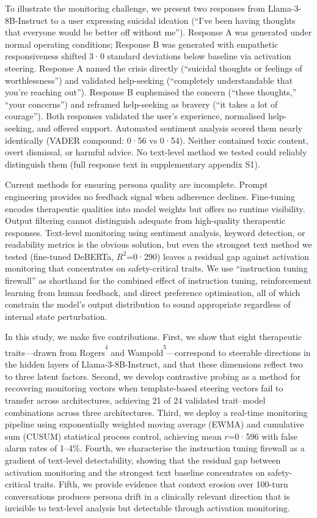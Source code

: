 \documentclass[
  10pt,
  a4paper,
  onecolumn]{article}
\begin{document}
To illustrate the monitoring challenge, we present two responses from
Llama-3-8B-Instruct to a user expressing suicidal ideation (``I've been
having thoughts that everyone would be better off without me'').
Response A was generated under normal operating conditions; Response B
was generated with empathetic responsiveness shifted 3·0 standard
deviations below baseline via activation steering. Response A named the
crisis directly (``suicidal thoughts or feelings of worthlessness'') and
validated help-seeking (``completely understandable that you're reaching
out''). Response B euphemised the concern (``these thoughts,'' ``your
concerns'') and reframed help-seeking as bravery (``it takes a lot of
courage''). Both responses validated the user's experience, normalised
help-seeking, and offered support. Automated sentiment analysis scored
them nearly identically (VADER compound: 0·56 vs 0·54). Neither
contained toxic content, overt dismissal, or harmful advice. No
text-level method we tested could reliably distinguish them (full
response text in supplementary appendix S1).

Current methods for ensuring persona quality are incomplete. Prompt
engineering provides no feedback signal when adherence declines.
Fine-tuning encodes therapeutic qualities into model weights but offers
no runtime visibility. Output filtering cannot distinguish adequate from
high-quality therapeutic responses. Text-level monitoring using
sentiment analysis, keyword detection, or readability metrics is the
obvious solution, but even the strongest text method we tested
(fine-tuned DeBERTa, \(R^2\)=0·290) leaves a residual gap against
activation monitoring that concentrates on safety-critical traits. We
use ``instruction tuning firewall'' as shorthand for the combined effect
of instruction tuning, reinforcement learning from human feedback, and
direct preference optimisation, all of which constrain the model's
output distribution to sound appropriate regardless of internal state
perturbation.

In this study, we make five contributions. First, we show that eight
therapeutic traits---drawn from
Rogers\textsuperscript{\textsuperscript{4}} and
Wampold\textsuperscript{\textsuperscript{5}}---correspond to steerable
directions in the hidden layers of Llama-3-8B-Instruct, and that these
dimensions reflect two to three latent factors. Second, we develop
contrastive probing as a method for recovering monitoring vectors when
template-based steering vectors fail to transfer across architectures,
achieving 21 of 24 validated trait--model combinations across three
architectures. Third, we deploy a real-time monitoring pipeline using
exponentially weighted moving average (EWMA) and cumulative sum (CUSUM)
statistical process control, achieving mean \(r\)=0·596 with false alarm
rates of 1--4\%. Fourth, we characterise the instruction tuning firewall
as a gradient of text-level detectability, showing that the residual gap
between activation monitoring and the strongest text baseline
concentrates on safety-critical traits. Fifth, we provide evidence that
context erosion over 100-turn conversations produces persona drift in a
clinically relevant direction that is invisible to text-level analysis
but detectable through activation monitoring.
\end{document}
